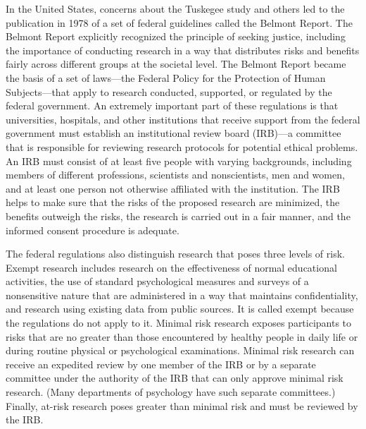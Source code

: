 In the United States, concerns about the Tuskegee study and others led to the publication in 1978 of a set of federal guidelines called the Belmont Report. The Belmont Report explicitly recognized the principle of seeking justice, including the importance of conducting research in a way that distributes risks and benefits fairly across different groups at the societal level. The Belmont Report became the basis of a set of laws---the Federal Policy for the Protection of Human Subjects---that apply to research conducted, supported, or regulated by the federal government. An extremely important part of these regulations is that universities, hospitals, and other institutions that receive support from the federal government must establish an institutional review board (IRB)---a committee that is responsible for reviewing research protocols for potential ethical problems. An IRB must consist of at least five people with varying backgrounds, including members of different professions, scientists and nonscientists, men and women, and at least one person not otherwise affiliated with the institution. The IRB helps to make sure that the risks of the proposed research are minimized, the benefits outweigh the risks, the research is carried out in a fair manner, and the informed consent procedure is adequate.

The federal regulations also distinguish research that poses three levels of risk. Exempt research includes research on the effectiveness of normal educational activities, the use of standard psychological measures and surveys of a nonsensitive nature that are administered in a way that maintains confidentiality, and research using existing data from public sources. It is called exempt because the regulations do not apply to it. Minimal risk research exposes participants to risks that are no greater than those encountered by healthy people in daily life or during routine physical or psychological examinations. Minimal risk research can receive an expedited review by one member of the IRB or by a separate committee under the authority of the IRB that can only approve minimal risk research. (Many departments of psychology have such separate committees.) Finally, at-risk research poses greater than minimal risk and must be reviewed by the IRB.



